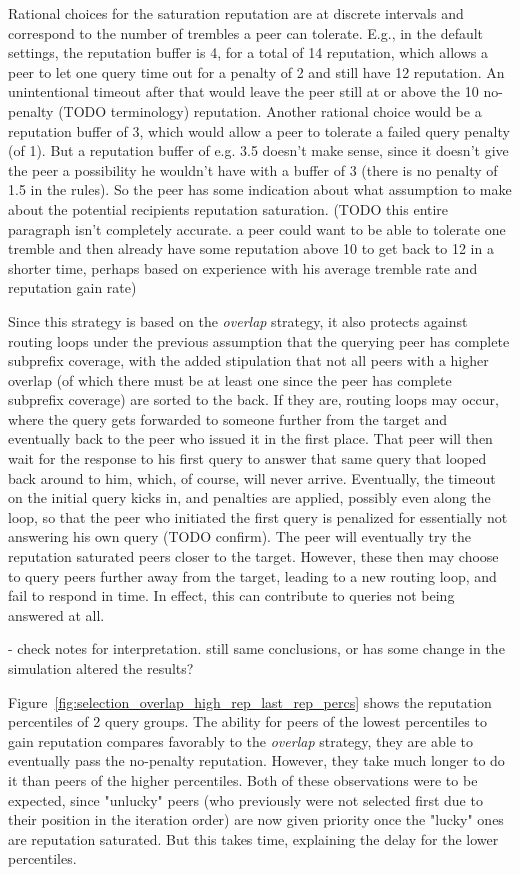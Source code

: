 Rational choices for the saturation reputation are at discrete intervals and
correspond to the number of trembles a peer can tolerate. E.g., in the default
settings, the reputation buffer is 4, for a total of 14 reputation, which allows
a peer to let one query time out for a penalty of 2 and still have 12
reputation. An unintentional timeout after that would leave the peer still at or
above the 10 no-penalty (TODO terminology) reputation. Another rational choice
would be a reputation buffer of 3, which would allow a peer to tolerate a failed
query penalty (of 1). But a reputation buffer of e.g. 3.5 doesn't make sense,
since it doesn't give the peer a possibility he wouldn't have with a buffer of
3 (there is no penalty of 1.5 in the rules). So the peer has some indication
about what assumption to make about the potential recipients reputation
saturation. (TODO this entire paragraph isn't completely accurate. a peer could
want to be able to tolerate one tremble and then already have some reputation
above 10 to get back to 12 in a shorter time, perhaps based on experience with
his average tremble rate and reputation gain rate)

Since this strategy is based on the \emph{overlap} strategy, it also protects
against routing loops under the previous assumption that the querying peer has
complete subprefix coverage, with the added stipulation that not all peers with
a higher overlap (of which there must be at least one since the peer has
complete subprefix coverage) are sorted to the back. If they are, routing loops
may occur, where the query gets forwarded to someone further from the target and
eventually back to the peer who issued it in the first place. That peer will
then wait for the response to his first query to answer that same query that
looped back around to him, which, of course, will never arrive. Eventually, the
timeout on the initial query kicks in, and penalties are applied, possibly even
along the loop, so that the peer who initiated the first query is penalized for
essentially not answering his own query (TODO confirm). The peer will eventually
try the reputation saturated peers closer to the target. However, these then may
choose to query peers further away from the target, leading to a new routing
loop, and fail to respond in time. In effect, this can contribute to queries not
being answered at all.

- check notes for interpretation. still same conclusions, or has some change in
  the simulation altered the results?

Figure~\ref{fig:selection_overlap_high_rep_last_rep_percs} shows the reputation
percentiles of 2 query groups. The ability for peers of the lowest percentiles
to gain reputation compares favorably to the \emph{overlap} strategy, they are
able to eventually pass the no-penalty reputation. However, they take much
longer to do it than peers of the higher percentiles. Both of these observations
were to be expected, since "unlucky" peers (who previously were not selected
first due to their position in the iteration order) are now given priority once
the "lucky" ones are reputation saturated.  But this takes time, explaining the
delay for the lower percentiles.

